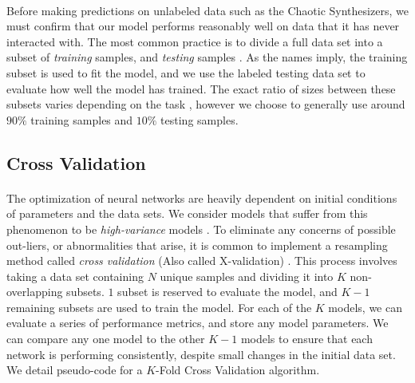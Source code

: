 \documentclass[12pt,letterpaper]{article}
\begin{document}
\paragraph*{}Before making predictions on unlabeled data such as the Chaotic Synthesizers, we must confirm that our model performs reasonably well on data that it has never interacted with. The most common practice is to divide a full data set into a subset of \textit{training} samples, and \textit{testing} samples \cite{Geron}. As the names imply, the training subset is used to fit the model, and we use the labeled testing data set to evaluate how well the model has trained. The exact ratio of sizes between these subsets varies depending on the task \cite{Goodfellow,Geron2,Mitchell}, however we choose to generally use around $90\%$ training samples and $10\%$ testing samples.


\subsection{Cross Validation}
\label{subsec-XValidation}

\paragraph*{}The optimization of neural networks are heavily dependent on initial conditions of parameters and the data sets. We consider models that suffer from this phenomenon to be \textit{high-variance} models \cite{James}. To eliminate any concerns of possible out-liers, or abnormalities that arise, it is common to implement a resampling method called \textit{cross validation} (Also called X-validation) \cite{Geron,Goodfellow}. This process involves taking a data set containing $N$ unique samples and dividing it into $K$ non-overlapping subsets. $1$ subset is reserved to evaluate the model, and $K-1$ remaining subsets are used to train the model. For each of the $K$ models, we can evaluate a series of performance metrics, and store any model parameters. We can compare any one model to the other $K-1$ models to ensure that each network is performing consistently, despite small changes in the initial data set. We detail pseudo-code for a $K$-Fold Cross Validation algorithm.
\end{document}
